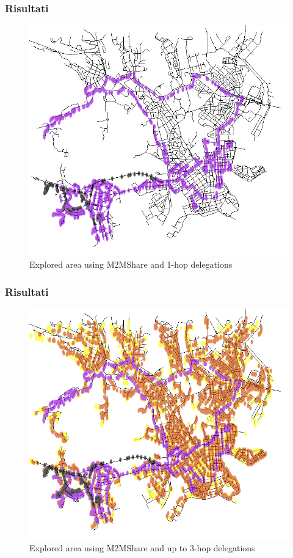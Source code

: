 \documentclass{beamer}
\begin{document}
\begin{frame}
\frametitle{Risultati}
\begin{center}
\begin{figure}[ht]
\includegraphics[scale=0.25]{../figure/mappa_1_hop.png}
    \caption{Explored area using M2MShare and 1-hop delegations}
\end{figure}
\end{center}
\end{frame}

\begin{frame}
\frametitle{Risultati}
\begin{center}
\begin{figure}[ht]
\includegraphics[scale=0.25]{../figure/mappa_3_hop.png}
    \caption{Explored area using M2MShare and up to 3-hop delegations}
\end{figure}
\end{center}
\end{frame}
\end{document}
